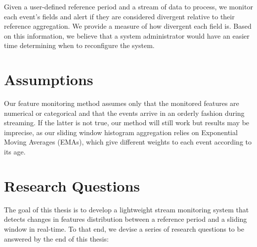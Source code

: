 Given a user-defined reference period and a stream of data to process, we monitor each event's fields and alert if they are considered divergent relative to their reference aggregation. We provide a measure of how divergent each field is. Based on this information, we believe that a system administrator would have an easier time determining when to reconfigure the system.

\section{Assumptions} \label{sec:assumptions}
Our feature monitoring method assumes only that the monitored features are numerical or categorical and that the events arrive in an orderly fashion during streaming. If the latter is not true, our method will still work but results may be imprecise, as our sliding window histogram aggregation relies on Exponential Moving Averages (EMAs), which give different weights to each event according to its age.

\section{Research Questions} \label{sec:rqs}
The goal of this thesis is to develop a lightweight stream monitoring system that detects changes in features distribution between a reference period and a sliding window in real-time. To that end, we devise a series of research questions to be answered by the end of this thesis:

